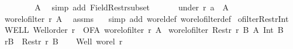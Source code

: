 \begin{isabellebody}
\ \ \ \isamarkupfalse%
\ \isamarkupfalse%
\ {\isachardoublequoteopen}{\isasymdots}\ {\isasymle}\ A{\isachardoublequoteclose}\ \isamarkupfalse%
\ {\isacharparenleft}{\kern0pt}simp\ add{\isacharcolon}{\kern0pt}\ Field{\isacharunderscore}{\kern0pt}Restr{\isacharunderscore}{\kern0pt}subset{\isacharparenright}{\kern0pt}\isanewline
\ \ \ \isamarkupfalse%
\ \isamarkupfalse%
\ {\isachardoublequoteopen}under\ r\ a\ {\isasymle}\ A{\isachardoublequoteclose}\ \isacommand{{\isachardot}{\kern0pt}}\isamarkupfalse%
\isanewline
\ \ \isacommand{{\isacharbraceright}{\kern0pt}}\isamarkupfalse%
\isanewline
\ \ \isamarkupfalse%
\ {\isachardoublequoteopen}wo{\isacharunderscore}{\kern0pt}rel{\isachardot}{\kern0pt}ofilter\ r\ A{\isachardoublequoteclose}\ \isamarkupfalse%
\ assms\ {\isacharasterisk}{\kern0pt}\ \isamarkupfalse%
\ {\isacharparenleft}{\kern0pt}simp\ add{\isacharcolon}{\kern0pt}\ wo{\isacharunderscore}{\kern0pt}rel{\isacharunderscore}{\kern0pt}def\ wo{\isacharunderscore}{\kern0pt}rel{\isachardot}{\kern0pt}ofilter{\isacharunderscore}{\kern0pt}def{\isacharparenright}{\kern0pt}\isanewline
{}\isamarkupfalse%
%
\endisatagproof
{\isafoldproof}%
%
\isadelimproof
\isanewline
%
\endisadelimproof
\isanewline
{}\isamarkupfalse%
\ ofilter{\isacharunderscore}{\kern0pt}Restr{\isacharunderscore}{\kern0pt}Int{\isacharcolon}{\kern0pt}\isanewline
{}\ WELL{\isacharcolon}{\kern0pt}\ {\isachardoublequoteopen}Well{\isacharunderscore}{\kern0pt}order\ r{\isachardoublequoteclose}\ \ OFA{\isacharcolon}{\kern0pt}\ {\isachardoublequoteopen}wo{\isacharunderscore}{\kern0pt}rel{\isachardot}{\kern0pt}ofilter\ r\ A{\isachardoublequoteclose}\isanewline
{}\ {\isachardoublequoteopen}wo{\isacharunderscore}{\kern0pt}rel{\isachardot}{\kern0pt}ofilter\ {\isacharparenleft}{\kern0pt}Restr\ r\ B{\isacharparenright}{\kern0pt}\ {\isacharparenleft}{\kern0pt}A\ Int\ B{\isacharparenright}{\kern0pt}{\isachardoublequoteclose}\isanewline
%
\isadelimproof
%
\endisadelimproof
%
\isatagproof
{}\isamarkupfalse%
{\isacharminus}{\kern0pt}\isanewline
\ \ \isamarkupfalse%
\ {\isacharquery}{\kern0pt}rB\ {\isacharequal}{\kern0pt}\ {\isachardoublequoteopen}Restr\ r\ B{\isachardoublequoteclose}\isanewline
\ \ \isamarkupfalse%
\ Well{\isacharcolon}{\kern0pt}\ {\isachardoublequoteopen}wo{\isacharunderscore}{\kern0pt}rel\ r{\isachardoublequoteclose}\ \isamarkupfalse%

\end{isabellebody}
